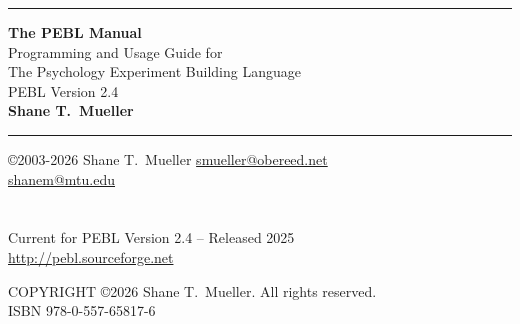\documentclass[10pt,twoside,openright,titlepage,letter]{book}
\begin{document}
\rule{\textwidth}{1mm}
\begin{center}
\LARGE
\textbf{The PEBL Manual} \\

\large
Programming and Usage Guide for\\
The Psychology Experiment Building Language\\
PEBL Version 2.4\\
\vspace{0.7cm}\Large \textbf{Shane T.~Mueller}
\end{center}
\rule{\textwidth}{1mm}


\vspace{.4cm}

\normalsize
\noindent\copyright 2003-2026 Shane T.~Mueller \href{mailto:smueller@obereed.net}{smueller@obereed.net}\\
\href{mailto:shanem@mtu.edu}{shanem@mtu.edu}\\
\\
\\


Current for PEBL Version 2.4 -- Released 2025 \\
\href{http://pebl.sourceforge.net}{http://pebl.sourceforge.net}


\newpage
\normalsize
\noindent COPYRIGHT \copyright 2026 Shane T.~Mueller. All rights reserved.\\
\vspace{2cm}
ISBN  978-0-557-65817-6\\

\tableofcontents

\clearpage
{}
\renewcommand{\chaptermark}[1]{\markboth{\textbf{Chapter \thechapter}.\ \emph{#1}}{}}










%

\appendix
\end{document}
